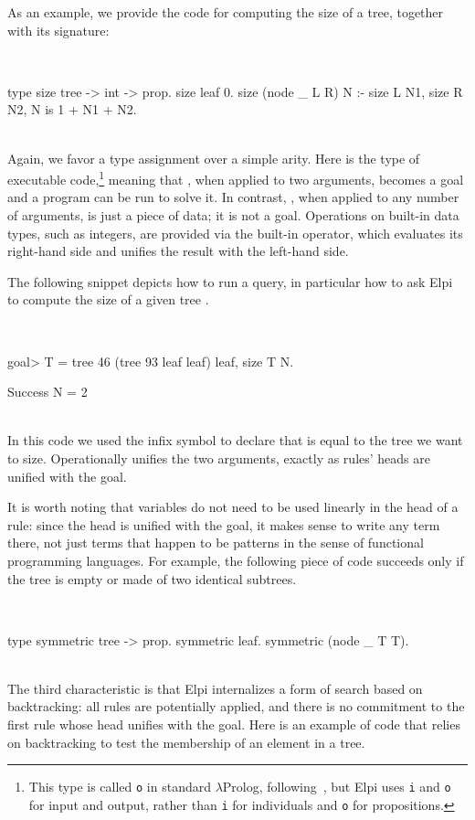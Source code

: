 \documentclass[a4paper, 11pt]{book}
\newenvironment{elpicode}
  {\VerbatimEnvironment~\\\begin{elpibox}\begin{xelpicode}}{\end{xelpicode}
\end{elpibox}\\}
\begin{document}
As an example, we provide the code for
computing the size of a tree, together with its signature:

\begin{elpicode}
type size tree -> int -> prop.
size leaf 0.
size (node _ L R) N :- size L N1, size R N2, N is 1 + N1 + N2.
\end{elpicode}
Again, we favor a type assignment over a simple arity.
Here  is the type
of executable code,\footnote{This type is called \texttt{o} in
standard $\lambda$Prolog, 
following~\cite{Church1940AFO}, but Elpi uses \texttt{i} and \texttt{o}
for input and output, rather than \texttt{i}  for individuals and 
\texttt{o} for propositions.}
 meaning that , when applied to two arguments,
becomes a goal and a program can be run to solve it. In contrast, ,
when applied to any number of arguments, is just a piece of data; it is not a
goal. 
Operations on built-in data types, such as integers, are provided via the
built-in  operator, which evaluates its right-hand side and unifies
the result with the left-hand side.

The following snippet depicts how to run a query, in particular
how to ask Elpi to compute the size  of a given
tree .

\begin{elpicode}
goal> T = tree 46 (tree 93 leaf leaf) leaf, size T N.

Success
  N = 2
\end{elpicode}
In this code we used the infix \elpi{=} symbol to declare that
 is equal to the tree we want to size. Operationally
\elpi{=} unifies the two arguments, exactly as rules' heads are
unified with the goal.

It is worth noting that variables do not need to be used linearly in the head
of a rule: since the head is unified with the goal, it makes sense to write
any term there, not just terms that happen to be patterns in the sense of
functional programming languages. For example, the following piece of code
succeeds only if the tree is empty or made of two identical subtrees.

\begin{elpicode}
type symmetric tree -> prop.
symmetric leaf.
symmetric (node _ T T).
\end{elpicode}
The third characteristic is that Elpi internalizes a form of search based on
backtracking: all rules are potentially applied, and there is no commitment to
the first rule whose head unifies with the goal. Here is an example of code
that relies on backtracking to test the membership of an element in a tree.
\end{document}
